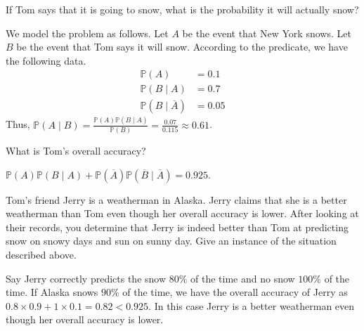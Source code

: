 \documentclass[11pt]{article}
\begin{document}
\begin{Parts}
    
    \Part If Tom says that it is going to snow, what is the probability it will actually snow?
    \begin{Answer}
        We model the problem as follows. Let $A$ be the event that New York snows. Let $B$ be the event that Tom 
        says it will snow. According to the predicate, we have the following data. 
        \begin{align*}
            \mathbb{P}(A)                  &= 0.1 \\
            \mathbb{P}(B \mid A)           &= 0.7 \\
            \mathbb{P}(B \mid \overline A) &= 0.05
        \end{align*}
        Thus, $\mathbb{P}(A \mid B) = \frac{\mathbb{P}(A)\mathbb{P}(B \mid A)}{\mathbb{P}(B)} = \frac{0.07}{0.115} \approx 0.61$. 
    \end{Answer}

    \Part What is Tom’s overall accuracy?
    \begin{Answer}
        $\mathbb{P}(A)\mathbb{P}(B \mid A) + \mathbb{P}(\overline A)\mathbb{P}(\overline B \mid \overline A) = 0.925$. 
    \end{Answer}

    \Part Tom’s friend Jerry is a weatherman in Alaska. Jerry claims that she is a better weatherman than Tom even 
          though her overall accuracy is lower. After looking at their records, you determine that Jerry is indeed 
          better than Tom at predicting snow on snowy days and sun on sunny day. Give an instance of the situation 
          described above.
    \begin{Answer}
        Say Jerry correctly predicts the snow $80\%$ of the time and no snow $100\%$ of the time. If Alaska snows
        $90\%$ of the time, we have the overall accuracy of Jerry as $0.8 \times 0.9 + 1 \times 0.1 = 0.82 < 0.925$. 
        In this case Jerry is a better weatherman even though her overall accuracy is lower. 
    \end{Answer}

\end{Parts}

\newpage
{}
\end{document}

